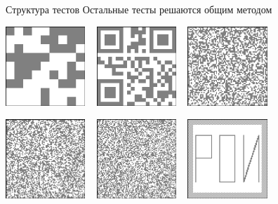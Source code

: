 \begin{frame}[t]{Структура тестов}
        Остальные тесты решаются общим методом

        \begin{center}
        \includegraphics[height=3cm]{cham09.png}
        ~
        \includegraphics[height=3cm]{cham10.png}
        ~
        \includegraphics[height=3cm]{cham11.png}
        \par
        \includegraphics[height=3cm]{cham12.png}
        ~
        \includegraphics[height=3cm]{cham13.png}
        ~
        \includegraphics[height=3cm]{cham14.png}
        \end{center}
\end{frame}
